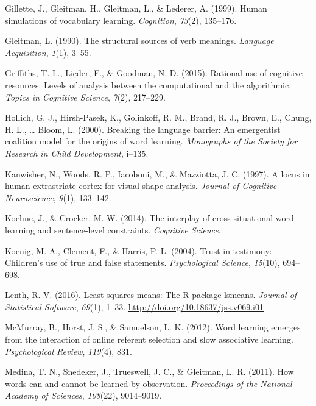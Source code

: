 \documentclass[authoryear, review]{elsarticle}
\begin{document}
\hypertarget{ref-gillette1999human}{}
Gillette, J., Gleitman, H., Gleitman, L., \& Lederer, A. (1999). Human
simulations of vocabulary learning. \emph{Cognition}, \emph{73}(2),
135--176.

\hypertarget{ref-gleitman1990structural}{}
Gleitman, L. (1990). The structural sources of verb meanings.
\emph{Language Acquisition}, \emph{1}(1), 3--55.

\hypertarget{ref-griffiths2015rational}{}
Griffiths, T. L., Lieder, F., \& Goodman, N. D. (2015). Rational use of
cognitive resources: Levels of analysis between the computational and
the algorithmic. \emph{Topics in Cognitive Science}, \emph{7}(2),
217--229.

\hypertarget{ref-hollich2000breaking}{}
Hollich, G. J., Hirsh-Pasek, K., Golinkoff, R. M., Brand, R. J., Brown,
E., Chung, H. L., \ldots{} Bloom, L. (2000). Breaking the language
barrier: An emergentist coalition model for the origins of word
learning. \emph{Monographs of the Society for Research in Child
Development}, i--135.

\hypertarget{ref-kanwisher1997locus}{}
Kanwisher, N., Woods, R. P., Iacoboni, M., \& Mazziotta, J. C. (1997). A
locus in human extrastriate cortex for visual shape analysis.
\emph{Journal of Cognitive Neuroscience}, \emph{9}(1), 133--142.

\hypertarget{ref-koehne2014interplay}{}
Koehne, J., \& Crocker, M. W. (2014). The interplay of cross-situational
word learning and sentence-level constraints. \emph{Cognitive Science}.

\hypertarget{ref-koenig2004trust}{}
Koenig, M. A., Clement, F., \& Harris, P. L. (2004). Trust in testimony:
Children's use of true and false statements. \emph{Psychological
Science}, \emph{15}(10), 694--698.

\hypertarget{ref-lenth2016lsmeans}{}
Lenth, R. V. (2016). Least-squares means: The R package lsmeans.
\emph{Journal of Statistical Software}, \emph{69}(1), 1--33.
\url{http://doi.org/10.18637/jss.v069.i01}

\hypertarget{ref-mcmurray2012word}{}
McMurray, B., Horst, J. S., \& Samuelson, L. K. (2012). Word learning
emerges from the interaction of online referent selection and slow
associative learning. \emph{Psychological Review}, \emph{119}(4), 831.

\hypertarget{ref-medina2011words}{}
Medina, T. N., Snedeker, J., Trueswell, J. C., \& Gleitman, L. R.
(2011). How words can and cannot be learned by observation.
\emph{Proceedings of the National Academy of Sciences}, \emph{108}(22),
9014--9019.
\end{document}
